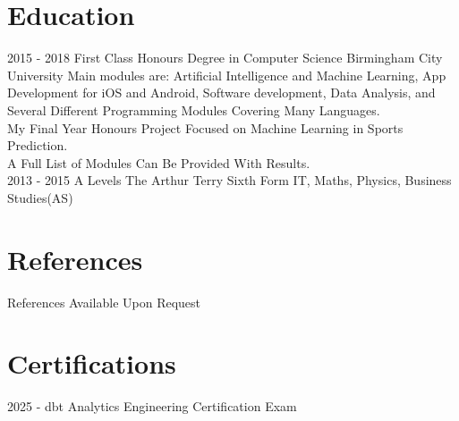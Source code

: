 \documentclass[]{friggeri-cv}
\begin{document}
\section{Education}

\begin{entrylist}
  \entry
    {2015 - 2018}
    {First Class Honours Degree in Computer Science}
    {Birmingham City University}
    {Main modules are: Artificial Intelligence and Machine Learning, App Development for iOS and Android, Software development, Data Analysis, and Several Different Programming Modules Covering Many Languages.
    \\ My Final Year Honours Project Focused on Machine Learning in Sports Prediction. 
    \\ A Full List of Modules Can Be Provided With Results.\\}
    \entry
    {2013 - 2015}
    {A Levels}
    {The Arthur Terry Sixth Form}
    {IT, Maths, Physics, Business Studies(AS)\\}
\end{entrylist}

\section{References}
References Available Upon Request

\section{Certifications}
2025 - dbt Analytics Engineering Certification Exam
\end{document}

